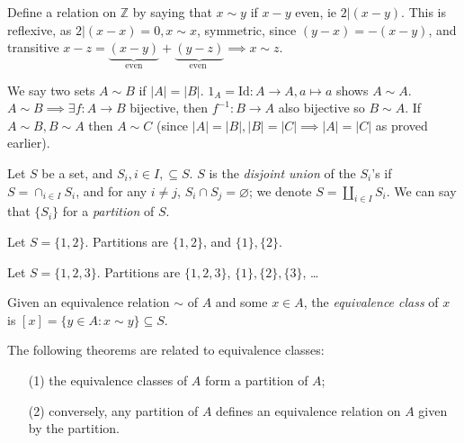 \documentclass[12pt,oneside]{article}
\begin{document}
\begin{example}\label{example:equiv2}
  Define a relation on $\mathbb{Z}$ by saying that $x \sim y$ if $x-y$ even, ie $2|(x-y)$. This is reflexive, as $2|(x-x) = 0, x \sim x$, symmetric, since $(y-x) = -(x-y)$, and transitive $x-z = \underbrace{(x-y)}_{\text{even}}+\underbrace{(y-z)}_{\text{even }} \implies x \sim z$.
\end{example}

\begin{example}\label{example:equiv3}
  We say two sets $A \sim B$ if $|A| = |B|$. $1_A = \text{Id}: A \to A, a \mapsto a$ shows $A \sim A$. $A \sim B \implies \exists f: A \to B$ bijective, then $f^{-1}: B \to A$ also bijective so $B \sim A$. If $A \sim B, B \sim A$ then $A \sim C$ (since $|A| = |B|, |B| = |C| \implies |A| = |C|$ as proved earlier).
\end{example}

\begin{definition}
  Let $S$ be a set, and $S_i, i \in I, \subseteq S$. $S$ is the \emph{disjoint union} of the $S_i$'s if $S = \cap_{i \in I} S_i$, and for any $i \neq j$, $S_i \cap S_j = \varnothing$\footnotemark; we denote 
  \(S = \amalg_{i \in I} S_i.\)
  We can say that $\{S_i\}$ for a \emph{partition} of $S$.
\end{definition}

\begin{example}
  Let $S = \{1,2\}$. Partitions are $\{1,2\}$, and $\{1\}, \{2\}$. 

  Let $S = \{1,2,3\}$. Partitions are $\{1,2,3\}$, $\{1\}, \{2\},\{3\}$, \dots
\end{example}

\begin{definition}
  Given an equivalence relation $\sim$ of $A$ and some $x \in A$, the \emph{equivalence class} of $x$ is $[x] = \{y \in A : x \sim y\} \subseteq S$.
\end{definition}

\begin{theorem}\label{thm:equivclass}
  The following theorems are related to equivalence classes:
  \begin{itemize}
    \item[(1)] the equivalence classes of $A$ form a partition of $A$;
    \item[(2)] conversely, any partition of $A$ defines an equivalence relation on $A$ given by the partition.
  \end{itemize}
\end{theorem}
\end{document}
